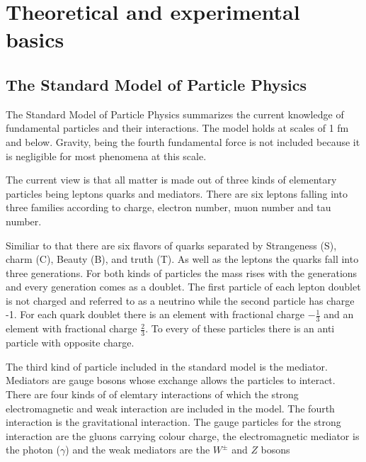 \chapter{Theoretical and experimental basics}
\label{theory}

\section{The Standard Model of Particle Physics}

The Standard Model of Particle Physics summarizes the current knowledge of fundamental particles and their interactions. The model holds at scales of 1 fm and below. Gravity, being the fourth fundamental force is not included because it is negligible for most phenomena at this scale.

The current view is that all matter is made out of three kinds of elementary particles being leptons quarks and mediators.
There are six leptons falling into three families according to charge, electron number, muon number and tau number. 

Similiar to that there are six flavors of quarks separated by Strangeness (S), charm (C), Beauty (B), and truth (T). As well as the leptons the quarks fall into three generations.
For both kinds of particles the mass rises with the generations and every generation comes as a doublet. The first particle of each lepton doublet is not charged and referred to as a neutrino while the second particle has charge -1.
For each quark doublet there is an element with fractional charge $-\frac{1}{3}$ and an element with fractional charge $\frac{2}{3}$.
To every of these particles there is an anti particle with opposite charge.

The third kind of particle included in the standard model is the mediator. Mediators are gauge bosons whose exchange allows the particles to interact. There are four kinds of of elemtary interactions of which the strong electromagnetic and weak interaction are included in the model. The fourth interaction is the gravitational interaction.
The gauge particles for the strong interaction are the gluons carrying colour charge, the electromagnetic mediator is the photon ($\gamma$) and the weak mediators are the $W^{\pm}$ and $Z$ bosons 


